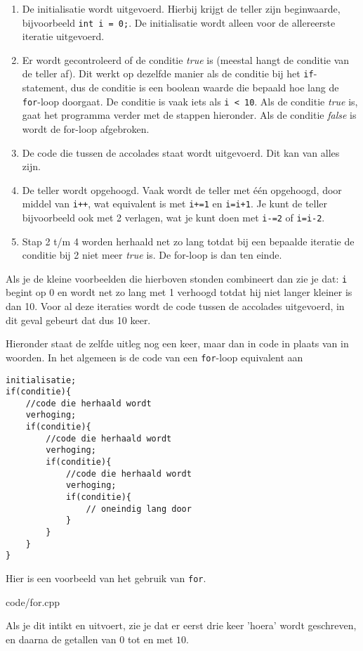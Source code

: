 \documentclass[12pt,a4paper]{article}
\newcommand{\code}{}
\newcommand{\icode}{\lstinline}
\begin{document}
\begin{enumerate}
	\item De initialisatie wordt uitgevoerd. Hierbij krijgt de teller zijn beginwaarde, bijvoorbeeld \icode{int i = 0;}. De initialisatie wordt alleen voor de allereerste iteratie uitgevoerd. 
	\item Er wordt gecontroleerd of de conditie \emph{true} is (meestal hangt de conditie van de teller af). Dit werkt op dezelfde manier als de conditie bij het \icode{if}-statement, dus de conditie is een boolean waarde die bepaald hoe lang de \icode{for}-loop doorgaat. De conditie is vaak iets als \icode{i < 10}. Als de conditie \emph{true} is, gaat het programma verder met de stappen hieronder. Als de conditie \emph{false} is wordt de for-loop afgebroken. 
	\item De code die tussen de accolades staat wordt uitgevoerd. Dit kan van alles zijn. 
	\item De teller wordt opgehoogd. Vaak wordt de teller met \'e\'en opgehoogd, door middel van \icode{i++}, wat equivalent is met \icode{i+=1} en \icode{i=i+1}. Je kunt de teller bijvoorbeeld ook met 2 verlagen, wat je kunt doen met \icode{i-=2} of \icode{i=i-2}.
	\item Stap 2 t/m 4 worden herhaald net zo lang totdat bij een bepaalde iteratie de conditie bij 2 niet meer \emph{true} is. De for-loop is dan ten einde. 
\end{enumerate}

Als je de kleine voorbeelden die hierboven stonden combineert dan zie je dat: \icode{i} begint op 0 en wordt net zo lang met 1 verhoogd totdat hij niet langer kleiner is dan 10. Voor al deze iteraties wordt de code tussen de accolades uitgevoerd, in dit geval gebeurt dat dus 10 keer. 

Hieronder staat de zelfde uitleg nog een keer, maar dan in code in plaats van in woorden. In het algemeen is de code van een \icode{for}-loop equivalent aan
\begin{lstlisting}
initialisatie;
if(conditie){
	//code die herhaald wordt
	verhoging;
	if(conditie){
		//code die herhaald wordt
		verhoging;
		if(conditie){
			//code die herhaald wordt
			verhoging;
			if(conditie){
				// oneindig lang door
			}
		}
	}
}
\end{lstlisting}
Hier is een voorbeeld van het gebruik van \icode{for}.

\code{code/for.cpp}

Als je dit intikt en uitvoert, zie je dat er eerst drie keer 'hoera' wordt geschreven, en daarna de getallen van $0$ tot en met $10$.
\end{document}
